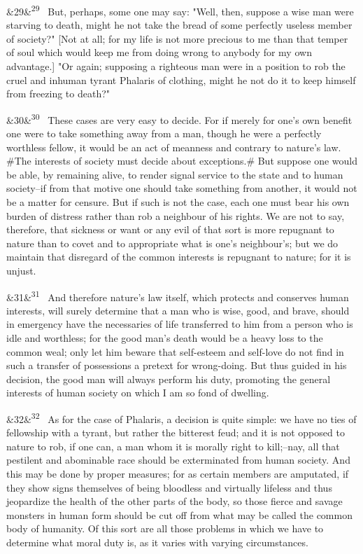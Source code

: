\documentclass[12pt]{article}
\newcommand{\para}[1][]{\par\noindent\ifx&#1&\else\textsuperscript{\footnotesize #1}~\fi}
\begin{document}
\para[29] But, perhaps, some one may say: "Well, then, suppose a wise man were starving to death, might he not take the bread of some perfectly useless member of society?" [Not at all; for my life is not more precious to me than that temper of soul which would keep me from doing wrong to anybody for my own advantage.] "Or again; supposing a righteous man were in a position to rob the cruel and inhuman tyrant Phalaris of clothing, might he not do it to keep himself from freezing to death?"

\para[30] These cases are very easy to decide. For if merely for one's own benefit one were to take something away from a man, though he were a perfectly worthless fellow, it would be an act of meanness and contrary to nature's law. \#The interests of society must decide about exceptions.\# But suppose one would be able, by remaining alive, to render signal service to the state and to human society--if from that motive one should take something from another, it would not be a matter for censure. But if such is not the case, each one must bear his own burden of distress rather than rob a neighbour of his rights. We are not to say, therefore, that sickness or want or any evil of that sort is more repugnant to nature than to covet and to appropriate what is one's neighbour's; but we do maintain that disregard of the common interests is repugnant to nature; for it is unjust.

\para[31] And therefore nature's law itself, which protects and conserves human interests, will surely determine that a man who is wise, good, and brave, should in emergency have the necessaries of life transferred to him from a person who is idle and worthless; for the good man's death would be a heavy loss to the common weal; only let him beware that self-esteem and self-love do not find in such a transfer of possessions a pretext for wrong-doing. But thus guided in his decision, the good man will always perform his duty, promoting the general interests of human society on which I am so fond of dwelling.

\para[32] As for the case of Phalaris, a decision is quite simple: we have no ties of fellowship with a tyrant, but rather the bitterest feud; and it is not opposed to nature to rob, if one can, a man whom it is morally right to kill;--nay, all that pestilent and abominable race should be exterminated from human society. And this may be done by proper measures; for as certain members are amputated, if they show signs themselves of being bloodless and virtually lifeless and thus jeopardize the health of the other parts of the body, so those fierce and savage monsters in human form should be cut off from what may be called the common body of humanity. Of this sort are all those problems in which we have to determine what moral duty is, as it varies with varying circumstances.
\end{document}
